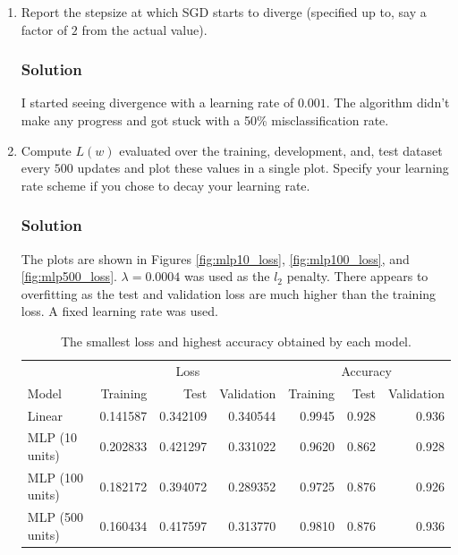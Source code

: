 \documentclass[letterpaper,11pt]{article}
\begin{document}
\begin{enumerate}
\item Report the stepsize at which SGD starts to diverge (specified up to, say a
  factor of $2$ from the actual value).

  \subsubsection*{Solution}

  I started seeing divergence with a learning rate of $0.001$. The algorithm
  didn't make any progress and got stuck with a 50\% misclassification rate.

  \item Compute $L(w)$ evaluated over the training, development, and, test
    dataset every $500$ updates and plot these values in a single plot. Specify
    your learning rate scheme if you chose to decay your learning rate.

    \subsubsection*{Solution}
    
    The plots are shown in Figures \ref{fig:mlp10_loss}, \ref{fig:mlp100_loss},
    and \ref{fig:mlp500_loss}. $\lambda = 0.0004$ was used as the $l_2$
    penalty. There appears to overfitting as the test and validation loss are
    much higher than the training loss. A fixed learning rate was used.

    \begin{table}
      \centering
      \begin{tabular}{lrrr|rrr}
        \toprule
        & \multicolumn{3}{c}{Loss} & \multicolumn{3}{c}{Accuracy} \\
        \cmidrule{2-4} \cmidrule{5-7}
        Model & Training & Test & Validation & Training & Test & Validation \\
        \midrule
        Linear & 0.141587 & 0.342109 & 0.340544 & 0.9945 & 0.928 & 0.936 \\
        MLP (10 units) & 0.202833 & 0.421297 & 0.331022 & 0.9620 & 0.862 & 0.928 \\
        MLP (100 units) & 0.182172&0.394072&0.289352 & 0.9725&0.876&0.926 \\
        MLP (500 units) & 0.160434&0.417597&0.313770&0.9810&0.876&0.936 \\
        \bottomrule
      \end{tabular}
      \caption{The smallest loss and highest accuracy obtained by each model.}
      \label{tab:model_results}
    \end{table}


\end{enumerate}
\end{document}
